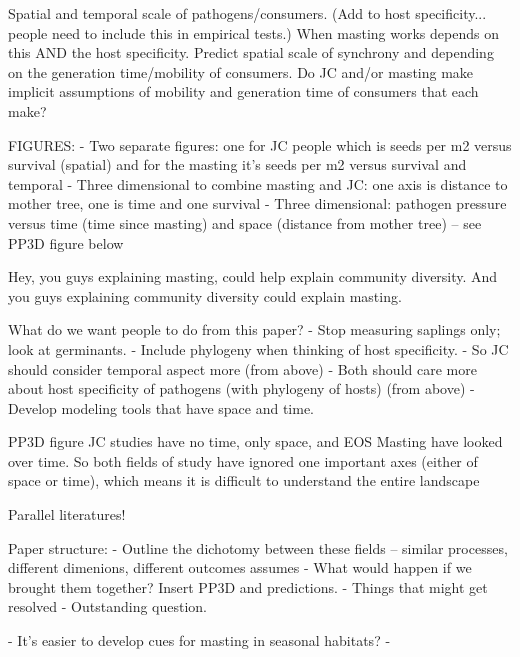 \documentclass[11pt]{article}
\begin{document}
Spatial and temporal scale of pathogens/consumers. (Add to host specificity... people need to include this in empirical tests.) When masting works depends on this AND the host specificity. Predict spatial scale of synchrony and depending on the generation time/mobility of consumers. Do JC and/or masting make implicit assumptions of mobility and generation time of consumers that each make? 

FIGURES:
- Two separate figures: one for JC people which is seeds per m2 versus survival (spatial) and for the masting it's seeds per m2 versus survival and temporal 
- Three dimensional to combine masting and JC: one axis is distance to mother tree, one is time and one survival
- Three dimensional: pathogen pressure versus time (time since masting) and space (distance from mother tree) -- see PP3D figure below

Hey, you guys explaining masting, could help explain community diversity.
And you guys explaining community diversity could explain masting. 

What do we want people to do from this paper? 
- Stop measuring saplings only; look at germinants. 
- Include phylogeny when thinking of host specificity. 
- So JC should consider temporal aspect more (from above) 
- Both should care more about host specificity of pathogens (with phylogeny of hosts) (from above)
- Develop modeling tools that have space and time. 


PP3D figure
JC studies have no time, only space, and EOS Masting have looked over time. So both fields of study have ignored one important axes (either of space or time), which means it is difficult to understand the entire landscape

Parallel literatures! 


Paper structure:
- Outline the dichotomy between these fields -- similar processes, different dimenions, different outcomes assumes
- What would happen if we brought them together? Insert PP3D and predictions.
- Things that might get resolved
- Outstanding question. 


- It's easier to develop cues for masting in seasonal habitats?
- 
\end{document}

